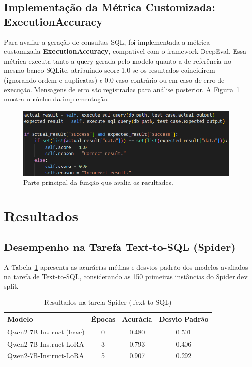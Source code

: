 \documentclass[journal,onecolumn]{IEEEtran}
\newcommand{\figwidth}{0.7\linewidth}
\begin{document}
\subsection{Implementação da Métrica Customizada: ExecutionAccuracy}

Para avaliar a geração de consultas SQL, foi implementada a métrica customizada \textbf{ExecutionAccuracy}, compatível com o framework DeepEval. Essa métrica executa tanto a query gerada pelo modelo quanto a de referência no mesmo banco SQLite, atribuindo score 1.0 se os resultados coincidirem (ignorando ordem e duplicatas) e 0.0 caso contrário ou em caso de erro de execução. Mensagens de erro são registradas para análise posterior. A Figura~\ref{fig:custom_metric_main} mostra o núcleo da implementação.
\begin{figure}[!htpb]
    \centering
    \includegraphics[width=\figwidth]{resources/custom_metric_main.png}
    \caption{Parte principal da função que avalia os resultados.}
    \label{fig:custom_metric_main}
\end{figure}

\section{Resultados}
\subsection{Desempenho na Tarefa Text-to-SQL (Spider)}

A Tabela~\ref{tab:spider_results} apresenta as acurácias médias e desvios padrão dos modelos avaliados na tarefa de Text-to-SQL, considerando as 150 primeiras instâncias do Spider dev split.

\begin{table}[h]
\centering
\caption{Resultados na tarefa Spider (Text-to-SQL)}
\label{tab:spider_results}
\begin{tabular}{lccc}
\toprule
\textbf{Modelo} & \textbf{Épocas} & \textbf{Acurácia} & \textbf{Desvio Padrão} \\
\midrule
Qwen2-7B-Instruct (base) & 0 & 0.480 & 0.501 \\
Qwen2-7B-Instruct-LoRA & 3 & 0.793 & 0.406 \\
Qwen2-7B-Instruct-LoRA & 5 & 0.907 & 0.292 \\
\bottomrule
\end{tabular}
\end{table}
\end{document}
